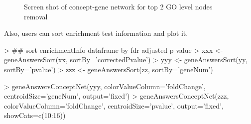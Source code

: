 \documentclass[a4paper]{article}
\begin{document}
\begin{figure}
\centering
\centering
{}
\caption{Screen shot of concept-gene network for top 2 GO level nodes removal}
\label{GO-genes network}
\end{figure}

Also, users can sort enrichment test information and plot it.
\begin{Schunk}
\begin{Sinput}
> ## sort enrichmentInfo dataframe by fdr adjusted p value
> xxx <- geneAnswersSort(xx, sortBy='correctedPvalue')
> yyy <- geneAnswersSort(yy, sortBy='pvalue') 
> zzz <- geneAnswersSort(zz, sortBy='geneNum')
\end{Sinput}
\end{Schunk}

\begin{Schunk}
\begin{Sinput}
> geneAnswersConceptNet(yyy, colorValueColumn='foldChange', centroidSize='geneNum', output='fixed')
> geneAnswersConceptNet(zzz, colorValueColumn='foldChange', centroidSize='pvalue', output='fixed', showCats=c(10:16))
\end{Sinput}
\end{Schunk}
\end{document}
